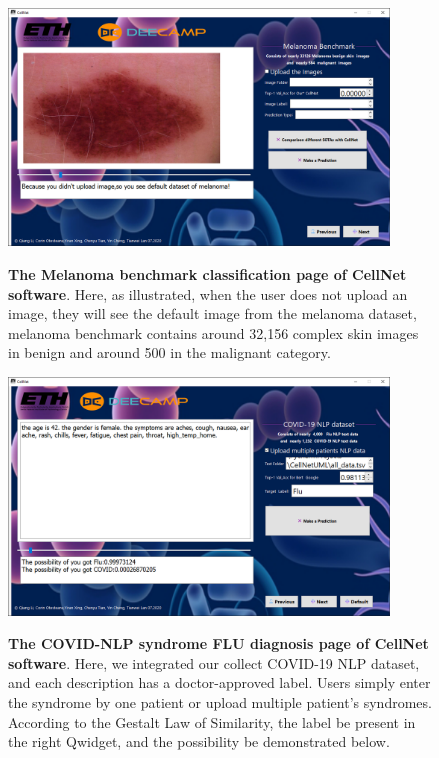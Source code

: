 {\begin{figure}[t]
\begin{center}
\includegraphics[height=0.3\textheight,width=0.9\textwidth]{thesis-template-master/images/cellnet6-1page.PNG}
\label{fig:cellnet}
\end{center}
\caption{ \textbf{The Melanoma benchmark classification page of CellNet software}. Here, as illustrated, when the user does not upload an image, they will see the default image from the melanoma dataset, melanoma benchmark contains around 32,156 complex skin images in benign and around 500 in the malignant category.}
\end{figure}


\begin{figure}[t]
\begin{center}
\includegraphics[height=0.3\textheight,width=0.9\textwidth]{thesis-template-master/images/cellnet7-2page.PNG}
\label{fig:cellnet}
\end{center}
\caption{ \textbf{The COVID-NLP syndrome FLU diagnosis page of CellNet software}. Here, we integrated our collect COVID-19 NLP dataset, and each description has a doctor-approved label. Users simply enter the syndrome by one patient or upload multiple patient's syndromes. According to the Gestalt Law of Similarity, the label be present in the right Qwidget, and the possibility be demonstrated below.}
\end{figure}


}
